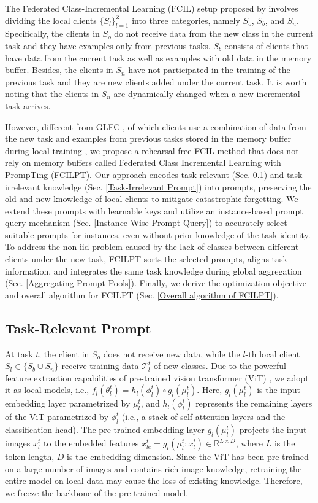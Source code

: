 \documentclass[sigconf,anonymous,review,screen]{acmart}
\begin{document}
The Federated Class-Incremental Learning (FCIL) setup proposed by \cite{dong2022federated} involves dividing the local clients $\{{ S_l }\}_{l=1}^Z$ into three categories, namely $S_o$, $S_b$, and $S_n$. Specifically, the clients in $S_o$ do not receive data from the new class in the current task and they have examples only from previous tasks. $S_b$ consists of clients that have data from the current task as well as examples with old data in the memory buffer. Besides, the clients in $S_n$ have not participated in the training of the previous task and they are new clients added under the current task. It is worth noting that the clients in $S_n$ are dynamically changed when a new incremental task arrives. 

However, different from GLFC \cite{dong2022federated}, of which clients use a combination of data from the new task and examples from previous tasks stored in the memory buffer during local training , we propose a rehearsal-free FCIL method that does not rely on memory buffers called Federated Class Incremental Learning with PrompTing (FCILPT). Our approach encodes task-relevant (Sec. \ref{Task-Relevant Prompt}) and task-irrelevant knowledge (Sec. \ref{Task-Irrelevant Prompt}) into prompts, preserving the old and new knowledge of local clients to mitigate catastrophic forgetting. We extend these prompts with learnable keys and utilize an instance-based prompt query mechanism (Sec. \ref{Instance-Wise Prompt Query}) to accurately select suitable prompts for instances, even without prior knowledge of the task identity. To address the non-iid problem caused by the lack of classes between different clients under the new task, FCILPT sorts the selected prompts, aligns task information, and integrates the same task knowledge during global aggregation (Sec. \ref{Aggregating Prompt Pools}). Finally, we derive the optimization objective and overall algorithm for FCILPT (Sec. \ref{Overall algorithm of FCILPT}).

\subsection{Task-Relevant Prompt}\label{Task-Relevant Prompt}
At task $t$, the client in $S_o$ does not receive new data, while the $l$-th local client $S_l \in \{S_b \cup S_n\}$ receive training data $\mathcal{T}_l^t$ of new classes. Due to the powerful feature extraction capabilities of pre-trained vision transformer (ViT) \cite{dosovitskiyimage}, we adopt it as local models, i.e., $f_l(\theta_l^t) = h_l(\phi_l^t) \circ g_l(\mu_l^t)$. Here, $g_l(\mu_l^t)$ is the input embedding layer parametrized by $\mu_l^t$, and $h_l(\phi_l^t)$ represents the remaining layers of the ViT parametrized by $\phi_l^t$ (i.e., a stack of self-attention layers and the classification head). The pre-trained embedding layer $g_l(\mu_l^t)$ projects the input images $x_l^t$ to the embedded features $x_{le}^t=g_l(\mu_l^t;x_l^t) \in \mathbb{R}^{L \times D}$, where $L$ is the token length, $D$ is the embedding dimension. Since the ViT has been pre-trained on a large number of images and contains rich image knowledge, retraining the entire model on local data may cause the loss of existing knowledge. Therefore, we freeze the backbone of the pre-trained model.
\end{document}
